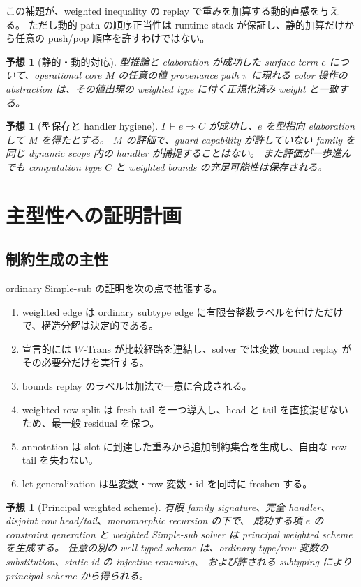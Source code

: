 \documentclass[uplatex,dvipdfmx,a4paper,11pt]{jsarticle}
\theoremstyle{jpplain}
\newtheorem{conjecture}[definition]{予想}
\begin{document}
この補題が、weighted inequality の replay で重みを加算する動的直感を与える。
ただし動的 path の順序正当性は runtime stack が保証し、静的加算だけから任意の push/pop 順序を許すわけではない。

\begin{conjecture}[静的・動的対応]
型推論と elaboration が成功した surface term $e$ について、operational core $M$ の任意の値 provenance path $\pi$ に現れる
color 操作の abstraction は、その値出現の weighted type に付く正規化済み weight と一致する。
\end{conjecture}

\begin{conjecture}[型保存と handler hygiene]
$\Gamma\vdash e\Rightarrow C$ が成功し、$e$ を型指向 elaboration して $M$ を得たとする。
$M$ の評価で、guard capability が許していない family を同じ dynamic scope 内の handler が捕捉することはない。
また評価が一歩進んでも computation type $C$ と weighted bounds の充足可能性は保存される。
\end{conjecture}

\section{主型性への証明計画}

\subsection{制約生成の主性}

ordinary Simple-sub の証明を次の点で拡張する。
\begin{enumerate}
  \item weighted edge は ordinary subtype edge に有限台整数ラベルを付けただけで、構造分解は決定的である。
  \item 宣言的には \(W\)-Trans が比較経路を連結し、solver では変数 bound replay がその必要分だけを実行する。
  \item bounds replay のラベルは加法で一意に合成される。
  \item weighted row split は fresh tail を一つ導入し、head と tail を直接混ぜないため、最一般 residual を保つ。
  \item annotation は slot に到達した重みから追加制約集合を生成し、自由な row tail を失わない。
  \item let generalization は型変数・row 変数・id を同時に freshen する。
\end{enumerate}

\begin{conjecture}[Principal weighted scheme]
有限 family signature、完全 handler、disjoint row head/tail、monomorphic recursion の下で、
成功する項 $e$ の constraint generation と weighted Simple-sub solver は principal weighted scheme を生成する。
任意の別の well-typed scheme は、ordinary type/row 変数の substitution、static id の injective renaming、
および許される subtyping により principal scheme から得られる。
\end{conjecture}
\end{document}
